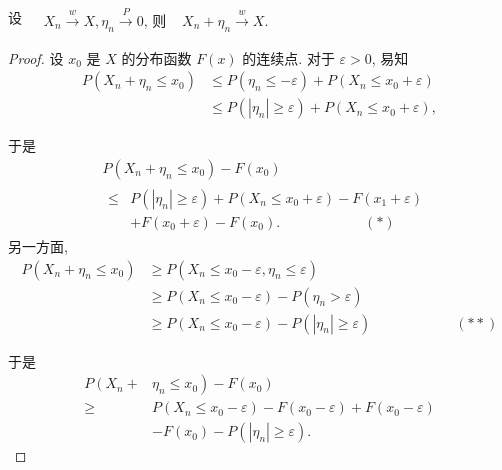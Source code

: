 \begin{theorem}
    设 $\begin{aligned} & X_n \stackrel{w}{\longrightarrow} X, \eta_n \stackrel{P}{\longrightarrow} 0 \text {, 则 }  & X_n+\eta_n \stackrel{w}{\longrightarrow} X .\end{aligned}$
\end{theorem}
{\small{
\begin{proof}
    设 $x_0$ 是 $X$ 的分布函数 $F(x)$ 的连续点. 对于 $\varepsilon>0$, 易知
$$
\begin{aligned}
P\left(X_n+\eta_n \leqslant x_0\right) & \leqslant P\left(\eta_n \leqslant-\varepsilon\right)+P\left(X_n \leqslant x_0+\varepsilon\right) \\
& \leqslant P\left(\left|\eta_n\right| \geqslant \varepsilon\right)+P\left(X_n \leqslant x_0+\varepsilon\right),
\end{aligned}
$$

于是
$$
\begin{aligned}
&P\left(X_n+\eta_n \leqslant x_0\right)-F\left(x_0\right)\\
&\begin{aligned}
\leqslant & P\left(\left|\eta_n\right| \geqslant \varepsilon\right)+P\left(X_n \leqslant x_0+\varepsilon\right)-F\left(x_1+\varepsilon\right) \\
& +F\left(x_0+\varepsilon\right)-F\left(x_0\right) . \qquad\qquad\qquad (*)
\end{aligned}
\end{aligned}
$$
另一方面,
$$
\begin{aligned}
P\left(X_n+\eta_n \leqslant x_0\right) & \geqslant P\left(X_n \leqslant x_0-\varepsilon, \eta_n \leqslant \varepsilon\right) \\
& \geqslant P\left(X_n \leqslant x_0-\varepsilon\right)-P\left(\eta_n>\varepsilon\right) \\
& \geqslant P\left(X_n \leqslant x_0-\varepsilon\right)-P\left(\left|\eta_n\right| \geqslant \varepsilon\right)\qquad\qquad\qquad (**)
\end{aligned}
$$

于是
$$
\begin{aligned}
P\left(X_n+\right. & \left.\eta_n \leqslant x_0\right)-F\left(x_0\right) \\
\geqslant & P\left(X_n \leqslant x_0-\varepsilon\right)-F\left(x_0-\varepsilon\right)+F\left(x_0-\varepsilon\right) \\
& -F\left(x_0\right)-P\left(\left|\eta_n\right| \geqslant \varepsilon\right) .
\end{aligned}
$$


\end{proof}}}
